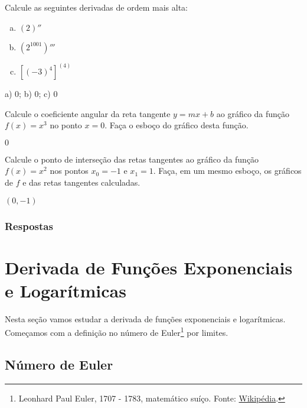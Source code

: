 \begin{exer}
  Calcule as seguintes derivadas de ordem mais alta:
  \begin{enumerate}[a)]
  \item $(2)''$
  \item $\left(2^{1001}\right)'''$
  \item $\left[(-3)^{4}\right]^{(4)}$
  \end{enumerate}
\end{exer}
\begin{resp}
  a) $0$; b) $0$; c) $0$
\end{resp}

\begin{exer}
  Calcule o coeficiente angular da reta tangente $y = mx + b$ ao gráfico da função $f(x) = x^3$ no ponto $x = 0$. Faça o esboço do gráfico desta função.
\end{exer}
\begin{resp}
  $0$
\end{resp}

\begin{exer}
  Calcule o ponto de interseção das retas tangentes ao gráfico da função $f(x) = x^2$ nos pontos $x_0=-1$ e $x_1 = 1$. Faça, em um mesmo esboço, os gráficos de $f$ e das retas tangentes calculadas.
\end{exer}
\begin{resp}
  $(0, -1)$
\end{resp}

\ifisbook
\subsubsection{Respostas}
\shipoutAnswer
\fi


\section{Derivada de Funções Exponenciais e Logarítmicas}\label{cap_deriv_sec_funexplog}

Nesta seção vamos estudar a derivada de funções exponenciais e logarítmicas. Começamos com a definição no número de Euler\footnote{Leonhard Paul Euler, 1707 - 1783, matemático suíço. Fonte: \href{https://pt.wikipedia.org/wiki/Leonhard_Euler}{Wikipédia}.} por limites.

\subsection{Número de Euler}

